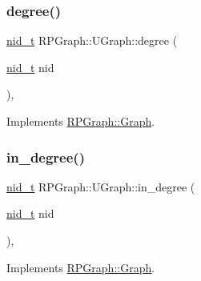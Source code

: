 \subsubsection{\texorpdfstring{degree()}{degree()}}
{\footnotesize\ttfamily \mbox{\hyperlink{namespaceRPGraph_ab3ae34f1ab88e48f43794c30c8697b74}{nid\+\_\+t}} R\+P\+Graph\+::\+U\+Graph\+::degree (\begin{DoxyParamCaption}\item[{\mbox{\hyperlink{namespaceRPGraph_ab3ae34f1ab88e48f43794c30c8697b74}{nid\+\_\+t}}}]{nid }\end{DoxyParamCaption})\hspace{0.3cm}{\ttfamily [override]}, {\ttfamily [virtual]}}



Implements \mbox{\hyperlink{classRPGraph_1_1Graph_a8a95d1f403c3d9860cf7399abc820c7d}{R\+P\+Graph\+::\+Graph}}.

\mbox{\label{classRPGraph_1_1UGraph_a5614092aab1bb8d92b625506f944d39c}} 
\subsubsection{\texorpdfstring{in\+\_\+degree()}{in\_degree()}}
{\footnotesize\ttfamily \mbox{\hyperlink{namespaceRPGraph_ab3ae34f1ab88e48f43794c30c8697b74}{nid\+\_\+t}} R\+P\+Graph\+::\+U\+Graph\+::in\+\_\+degree (\begin{DoxyParamCaption}\item[{\mbox{\hyperlink{namespaceRPGraph_ab3ae34f1ab88e48f43794c30c8697b74}{nid\+\_\+t}}}]{nid }\end{DoxyParamCaption})\hspace{0.3cm}{\ttfamily [override]}, {\ttfamily [virtual]}}



Implements \mbox{\hyperlink{classRPGraph_1_1Graph_ab75e19f698a4ab99e37593c7178f2c1a}{R\+P\+Graph\+::\+Graph}}.

\mbox{\label{classRPGraph_1_1UGraph_a8cc5be5cfd41f351d4f98de816028f90}} 
